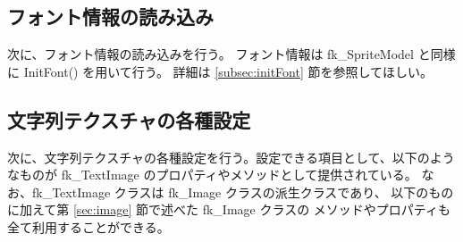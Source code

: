 \subsection{フォント情報の読み込み}
次に、フォント情報の読み込みを行う。
フォント情報は fk\_SpriteModel と同様に InitFont() を用いて行う。
詳細は \ref{subsec:initFont} 節を参照してほしい。

\subsection{文字列テクスチャの各種設定}
次に、文字列テクスチャの各種設定を行う。設定できる項目として、以下のようなものが
fk\_TextImage のプロパティやメソッドとして提供されている。
なお、fk\_TextImage クラスは fk\_Image クラスの派生クラスであり、
以下のものに加えて第 \ref{sec:image} 節で述べた fk\_Image クラスの
メソッドやプロパティも全て利用することができる。

